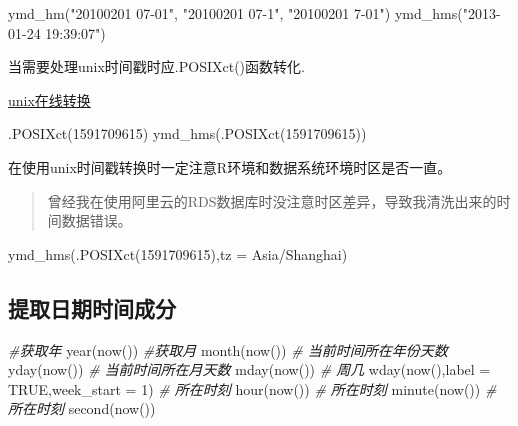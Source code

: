 \documentclass[
]{book}
\newenvironment{Shaded}{\begin{snugshade}}{\end{snugshade}}
\newcommand{\AttributeTok}[1]{\textcolor[rgb]{0.77,0.63,0.00}{#1}}
\newcommand{\CommentTok}[1]{\textcolor[rgb]{0.56,0.35,0.01}{\textit{#1}}}
\newcommand{\ConstantTok}[1]{\textcolor[rgb]{0.00,0.00,0.00}{#1}}
\newcommand{\DecValTok}[1]{\textcolor[rgb]{0.00,0.00,0.81}{#1}}
\newcommand{\FunctionTok}[1]{\textcolor[rgb]{0.00,0.00,0.00}{#1}}
\newcommand{\NormalTok}[1]{#1}
\newcommand{\StringTok}[1]{\textcolor[rgb]{0.31,0.60,0.02}{#1}}
\begin{document}
\begin{Shaded}
\begin{Highlighting}[]
\FunctionTok{ymd\_hm}\NormalTok{(}\StringTok{"20100201 07{-}01"}\NormalTok{, }\StringTok{"20100201 07{-}1"}\NormalTok{, }\StringTok{"20100201 7{-}01"}\NormalTok{)}
\FunctionTok{ymd\_hms}\NormalTok{(}\StringTok{"2013{-}01{-}24 19:39:07"}\NormalTok{)}
\end{Highlighting}
\end{Shaded}

当需要处理unix时间戳时应.POSIXct()函数转化.

\href{https://unixtime.51240.com/}{unix在线转换}

\begin{Shaded}
\begin{Highlighting}[]
\FunctionTok{.POSIXct}\NormalTok{(}\DecValTok{1591709615}\NormalTok{)}
\FunctionTok{ymd\_hms}\NormalTok{(}\FunctionTok{.POSIXct}\NormalTok{(}\DecValTok{1591709615}\NormalTok{))}
\end{Highlighting}
\end{Shaded}

在使用unix时间戳转换时一定注意R环境和数据系统环境时区是否一直。

\begin{quote}
曾经我在使用阿里云的RDS数据库时没注意时区差异，导致我清洗出来的时间数据错误。
\end{quote}

\begin{Shaded}
\begin{Highlighting}[]
\FunctionTok{ymd\_hms}\NormalTok{(}\FunctionTok{.POSIXct}\NormalTok{(}\DecValTok{1591709615}\NormalTok{),}\AttributeTok{tz =} \StringTok{\textquotesingle{}Asia/Shanghai\textquotesingle{}}\NormalTok{)}
\end{Highlighting}
\end{Shaded}

\hypertarget{extracting-datetime-information}{%
\subsection{提取日期时间成分}\label{extracting-datetime-information}}

\begin{Shaded}
\begin{Highlighting}[]
\CommentTok{\#获取年}
\FunctionTok{year}\NormalTok{(}\FunctionTok{now}\NormalTok{())  }
\CommentTok{\#获取月}
\FunctionTok{month}\NormalTok{(}\FunctionTok{now}\NormalTok{())}
\CommentTok{\# 当前时间所在年份天数}
\FunctionTok{yday}\NormalTok{(}\FunctionTok{now}\NormalTok{())}
\CommentTok{\# 当前时间所在月天数}
\FunctionTok{mday}\NormalTok{(}\FunctionTok{now}\NormalTok{())}
\CommentTok{\# 周几}
\FunctionTok{wday}\NormalTok{(}\FunctionTok{now}\NormalTok{(),}\AttributeTok{label =} \ConstantTok{TRUE}\NormalTok{,}\AttributeTok{week\_start =} \DecValTok{1}\NormalTok{)}
\CommentTok{\# 所在时刻}
\FunctionTok{hour}\NormalTok{(}\FunctionTok{now}\NormalTok{())}
\CommentTok{\# 所在时刻}
\FunctionTok{minute}\NormalTok{(}\FunctionTok{now}\NormalTok{())}
\CommentTok{\# 所在时刻}
\FunctionTok{second}\NormalTok{(}\FunctionTok{now}\NormalTok{())}
\end{Highlighting}
\end{Shaded}
\end{document}

